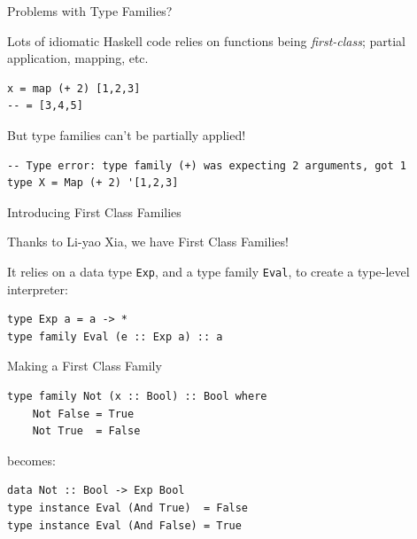 \documentclass{beamer}
\newcommand{\inline}[1]{\lstinline[basicstyle=\ttfamily]{#1}}
\begin{document}
\begin{frame}[fragile]{Problems with Type Families?}

Lots of idiomatic Haskell code relies on functions being \emph{first-class}; partial application, mapping, etc.

\begin{lstlisting}
x = map (+ 2) [1,2,3]
-- = [3,4,5]
\end{lstlisting}

\pause

But type families can't be partially applied!

\begin{lstlisting}
-- Type error: type family (+) was expecting 2 arguments, got 1
type X = Map (+ 2) '[1,2,3]
\end{lstlisting}
    
\end{frame}

\begin{frame}[fragile]{Introducing First Class Families}

Thanks to Li-yao Xia, we have First Class Families!

It relies on a data type \inline{Exp}, and a type family \inline{Eval}, to create a type-level interpreter:

\begin{lstlisting}
type Exp a = a -> *
type family Eval (e :: Exp a) :: a
\end{lstlisting}


\end{frame}

\begin{frame}[fragile]{Making a First Class Family}

\begin{lstlisting}
type family Not (x :: Bool) :: Bool where
    Not False = True
    Not True  = False
\end{lstlisting}

becomes:

\begin{lstlisting}
data Not :: Bool -> Exp Bool
type instance Eval (And True)  = False
type instance Eval (And False) = True
\end{lstlisting}

\end{frame}
\end{document}

